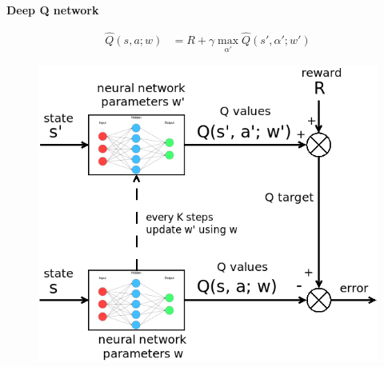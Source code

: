 \documentclass[xcolor=dvipsnames]{beamer}
\begin{document}
\begin{frame}{\bf Deep Q network }

    \begin{align*}
      \hat{Q}(s, a; w) &= R + \gamma \max \limits_{\alpha'} \hat{Q}(s', \alpha'; w')
    \end{align*}

    \begin{figure}[!htb]
      \centering
      \includegraphics[scale=0.3]{../../diagrams/dqn.png}
    \end{figure}

\end{frame}
\end{document}
